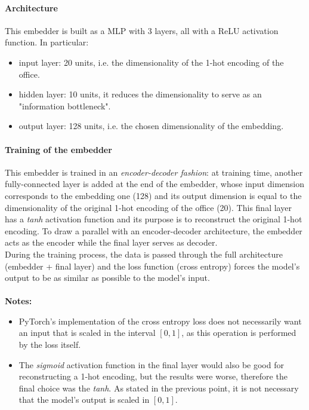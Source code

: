 \documentclass[12pt]{article}
\begin{document}
\paragraph{Architecture}
This embedder is built as a MLP with 3 layers, all with a ReLU activation function. In particular:
\begin{itemize}
    \item input layer: 20 units, i.e. the dimensionality of the 1-hot encoding of the office.
    \item hidden layer: 10 units, it reduces the dimensionality to serve as an "information bottleneck".
    \item output layer: 128 units, i.e. the chosen dimensionality of the embedding.
\end{itemize}
\paragraph{Training of the embedder}
This embedder is trained in an \textit{encoder-decoder fashion}:
at training time, another fully-connected layer is added at the end of the embedder, whose input dimension corresponds to the embedding one (128) and its output dimension is equal to the dimensionality of the original 1-hot encoding of the office (20).
This final layer has a \textit{tanh} activation function and its purpose is to reconstruct the original 1-hot encoding.
To draw a parallel with an encoder-decoder architecture, the embedder acts as the encoder while the final layer serves as decoder.\\
During the training process, the data is passed through the full architecture (embedder + final layer) and the loss function (cross entropy) forces the model's output to be as similar as possible to the model's input.\\\\
\textbf{Notes:}
\begin{itemize}
    \item PyTorch's implementation of the cross entropy loss \cite{pytorch_crossentropy} does not necessarily want an input that is scaled in the interval $[0,1]$, as this operation is performed by the loss itself.
    \item The \textit{sigmoid} activation function in the final layer would also be good for reconstructing a 1-hot encoding, but the results were worse, therefore the final choice was the \textit{tanh}. As stated in the previous point, it is not necessary that the model's output is scaled in $[0,1]$.
\end{itemize}
\end{document}
